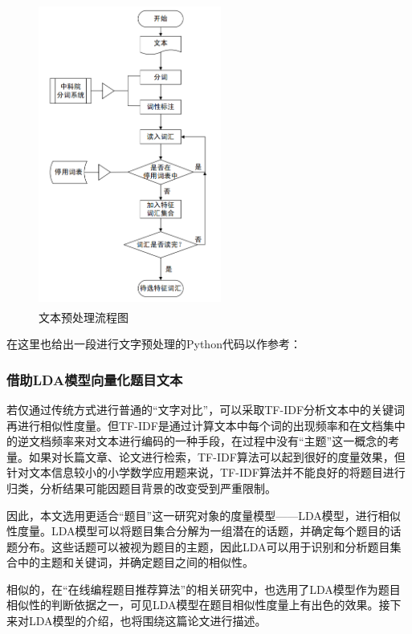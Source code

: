\begin{figure}[htbp]
    \centering
    \label{photo041944}
    \includegraphics[width=6cm,height=10cm]{res/Text preprocessing process.png}
    \caption{文本预处理流程图}
\end{figure} 

在这里也给出一段进行文字预处理的Python代码以作参考：

\begin{mgCodeBlock}
\end{mgCodeBlock}

\subsubsection{借助LDA模型向量化题目文本}

若仅通过传统方式进行普通的“文字对比”，可以采取TF-IDF分析文本中的关键词再进行相似性度量。但TF-IDF是通过计算文本中每个词的出现频率和在文档集中的逆文档频率来对文本进行编码的一种手段，在过程中没有“主题”这一概念的考量。如果对长篇文章、论文进行检索，TF-IDF算法可以起到很好的度量效果，但针对文本信息较小的小学数学应用题来说，TF-IDF算法并不能良好的将题目进行归类，分析结果可能因题目背景的改变受到严重限制。

因此，本文选用更适合“题目”这一研究对象的度量模型——LDA模型，进行相似性度量。LDA模型可以将题目集合分解为一组潜在的话题，并确定每个题目的话题分布。这些话题可以被视为题目的主题，因此LDA可以用于识别和分析题目集合中的主题和关键词，并确定题目之间的相似性。

相似的，在“在线编程题目推荐算法”的相关研究中\cite{LuoRongHeZhiShiDianYuTuJuanJiDeZaiXianBianChengTiMuTuiJianSuanFa}，也选用了LDA模型作为题目相似性的判断依据之一，可见LDA模型在题目相似性度量上有出色的效果。接下来对LDA模型的介绍，也将围绕这篇论文进行描述。


